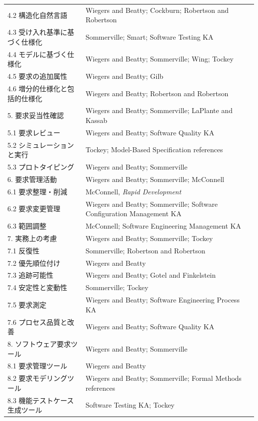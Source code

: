 \documentclass[uplatex,10pt,dvipdfmx,nomag]{jsarticle}
\begin{document}
\begin{longtable}{@{}p{.38\linewidth}p{.55\linewidth}@{}}
4.2 構造化自然言語 & Wiegers and Beatty; Cockburn; Robertson and Robertson \\
4.3 受け入れ基準に基づく仕様化 & Sommerville; Smart; Software Testing KA \\
4.4 モデルに基づく仕様化 & Wiegers and Beatty; Sommerville; Wing; Tockey \\
4.5 要求の追加属性 & Wiegers and Beatty; Gilb \\
4.6 増分的仕様化と包括的仕様化 & Wiegers and Beatty; Robertson and Robertson \\
5. 要求妥当性確認 & Wiegers and Beatty; Sommerville; LaPlante and Kassab \\
5.1 要求レビュー & Wiegers and Beatty; Software Quality KA \\
5.2 シミュレーションと実行 & Tockey; Model-Based Specification references \\
5.3 プロトタイピング & Wiegers and Beatty; Sommerville \\
6. 要求管理活動 & Wiegers and Beatty; Sommerville; McConnell \\
6.1 要求整理・削減 & McConnell, \textit{Rapid Development} \\
6.2 要求変更管理 & Wiegers and Beatty; Sommerville; Software Configuration Management KA \\
6.3 範囲調整 & McConnell; Software Engineering Management KA \\
7. 実務上の考慮 & Wiegers and Beatty; Sommerville; Tockey \\
7.1 反復性 & Sommerville; Robertson and Robertson \\
7.2 優先順位付け & Wiegers and Beatty \\
7.3 追跡可能性 & Wiegers and Beatty; Gotel and Finkelstein \\
7.4 安定性と変動性 & Sommerville; Tockey \\
7.5 要求測定 & Wiegers and Beatty; Software Engineering Process KA \\
7.6 プロセス品質と改善 & Wiegers and Beatty; Software Quality KA \\
8. ソフトウェア要求ツール & Wiegers and Beatty; Sommerville \\
8.1 要求管理ツール & Wiegers and Beatty \\
8.2 要求モデリングツール & Wiegers and Beatty; Sommerville; Formal Methods references \\
8.3 機能テストケース生成ツール & Software Testing KA; Tockey \\
\bottomrule
\end{longtable}
\normalsize
\end{document}
